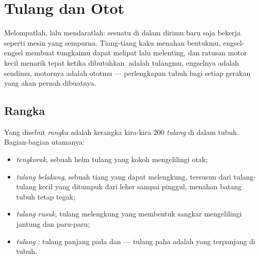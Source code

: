 \chapter{Tulang dan Otot}\label{ch:g3:bones-and-muscles}

Melompatlah, lalu mendaratlah: sesuatu di dalam dirimu baru saja
bekerja seperti mesin yang sempurna. Tiang-tiang kaku menahan
bentukmu, engsel-engsel membuat tungkaimu dapat melipat lalu
melenting, dan ratusan motor kecil menarik tepat ketika dibutuhkan.
 adalah tulangmu, engselnya adalah sendimu, motornya adalah
ototmu --- perlengkapan tubuh bagi setiap gerakan yang akan pernah
dibuatnya.

\section{Rangka}

\begin{definition}\label{def:g3:bones-and-muscles:skeleton}
Yang disebut \emph{rangka} adalah kerangka kira-kira
$200$ \emph{tulang} di dalam tubuh. Bagian-bagian
utamanya:
\begin{itemize}
  \item \emph{tengkorak}, sebuah helm tulang yang
        kokoh mengelilingi otak;
  \item \emph{tulang belakang}, sebuah tiang
        yang dapat melengkung, tersusun dari tulang-tulang kecil yang
        ditumpuk dari leher sampai pinggul, menahan batang tubuh tetap
        tegak;
  \item \emph{tulang rusuk}, tulang melengkung
        yang membentuk sangkar mengelilingi jantung dan paru-paru;
  \item \emph{tulang }: tulang panjang pada  dan
         --- tulang paha adalah yang terpanjang di tubuh.
\end{itemize}
\end{definition}

